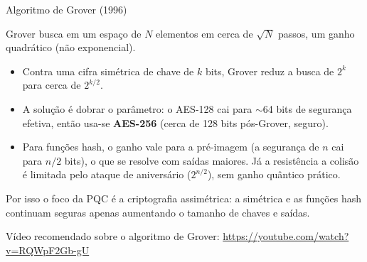 \documentclass{beamer}
\begin{document}
\begin{frame}{Algoritmo de Grover (1996)}
    \begin{tcolorbox}[colback=gray!8,colframe=gray!60!black,boxrule=0.5pt]
        \centering\footnotesize
        Grover busca em um espaço de $N$ elementos em cerca de $\sqrt{N}$ passos, um ganho quadrático (não exponencial).
    \end{tcolorbox}
    \medskip
    \begin{itemize}
        \footnotesize
        \item Contra uma cifra simétrica de chave de $k$ bits, Grover reduz a busca de $2^{k}$ para cerca de $2^{k/2}$.
        \item A solução é dobrar o parâmetro: o AES-128 cai para $\sim$64 bits de segurança efetiva, então usa-se \textbf{AES-256} (cerca de 128 bits pós-Grover, seguro).
        \item Para funções hash, o ganho vale para a pré-imagem (a segurança de $n$ cai para $n/2$ bits), o que se resolve com saídas maiores. Já a resistência a colisão é limitada pelo ataque de aniversário ($2^{n/2}$), sem ganho quântico prático.
    \end{itemize}
    \medskip
    \begin{tcolorbox}[colback=green!6,colframe=green!50!black,boxrule=0.5pt]
        \footnotesize
        Por isso o foco da PQC é a criptografia assimétrica: a simétrica e as funções hash continuam seguras apenas aumentando o tamanho de chaves e saídas.
    \end{tcolorbox}
    \smallskip
    {\tiny Vídeo recomendado sobre o algoritmo de Grover: \url{https://youtube.com/watch?v=RQWpF2Gb-gU}}
\end{frame}
\end{document}
